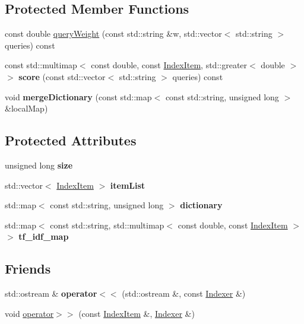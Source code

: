 \subsection*{Protected Member Functions}
\begin{DoxyCompactItemize}
\item 
const double \hyperlink{classIndexer_a3ed434e77eb37143f76b940e37cd878e}{query\+Weight} (const std\+::string \&w, std\+::vector$<$ std\+::string $>$ queries) const
\item 
\mbox{\label{classIndexer_a81e5a541f5801dfd920204e5658e6041}} 
const std\+::multimap$<$ const double, const \hyperlink{classIndexItem}{Index\+Item}, std\+::greater$<$ double $>$ $>$ {\bfseries score} (const std\+::vector$<$ std\+::string $>$ queries) const
\item 
\mbox{\label{classIndexer_a9d4586811c2b1309d992f4bbd658c642}} 
void {\bfseries merge\+Dictionary} (const std\+::map$<$ const std\+::string, unsigned long $>$ \&local\+Map)
\end{DoxyCompactItemize}
\subsection*{Protected Attributes}
\begin{DoxyCompactItemize}
\item 
\mbox{\label{classIndexer_acf4b55a819c5aa20627d82fa5db6d6b4}} 
unsigned long {\bfseries size}
\item 
\mbox{\label{classIndexer_aca2bf335cd368f8c7d7772030ee8d7b2}} 
std\+::vector$<$ \hyperlink{classIndexItem}{Index\+Item} $>$ {\bfseries item\+List}
\item 
\mbox{\label{classIndexer_a31dba7bca42ac3ca2a7fef6a4f6e6662}} 
std\+::map$<$ const std\+::string, unsigned long $>$ {\bfseries dictionary}
\item 
\mbox{\label{classIndexer_aeed3684e566f3970a43bd78524ad0b2c}} 
std\+::map$<$ const std\+::string, std\+::multimap$<$ const double, const \hyperlink{classIndexItem}{Index\+Item} $>$ $>$ {\bfseries tf\+\_\+idf\+\_\+map}
\end{DoxyCompactItemize}
\subsection*{Friends}
\begin{DoxyCompactItemize}
\item 
\mbox{\label{classIndexer_ad9c367f7e3c8863e70f9967d69f29404}} 
std\+::ostream \& {\bfseries operator$<$$<$} (std\+::ostream \&, const \hyperlink{classIndexer}{Indexer} \&)
\item 
void \hyperlink{classIndexer_a3169c2dd098e8a2c7f5c4bb628766720}{operator$>$$>$} (const \hyperlink{classIndexItem}{Index\+Item} \&, \hyperlink{classIndexer}{Indexer} \&)
\end{DoxyCompactItemize}


